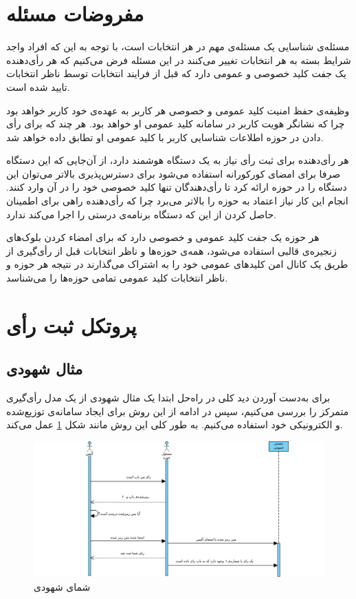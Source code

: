 \section{مفروضات مسئله}
مسئله‌ی شناسایی یک مسئله‌ی مهم در هر انتخابات است، با توجه به این که افراد واجد شرایط بسته به هر انتخابات تغییر می‌کنند در این مسئله فرض می‌کنیم که هر رأی‌دهنده یک جفت کلید خصوصی و عمومی دارد که قبل از فرایند انتخابات توسط ناظر انتخابات تایید شده است. 
\par
وظیفه‌ی حفظ امنیت کلید عمومی و خصوصی هر کاربر به عهده‌ی خود کاربر خواهد بود چرا که نشانگر هویت کاربر در سامانه‌ کلید عمومی او خواهد بود. هر چند که برای رأی دادن در حوزه اطلاعات شناسایی کاربر با کلید عمومی او تطابق داده خواهد شد.
\par
هر رأی‌دهنده برای ثبت رأی نیاز به یک دستگاه هوشمند دارد، از آن‌جایی که این دستگاه صرفا برای امضای کورکورانه استفاده می‌شود برای دسترس‌پذیری بالاتر می‌توان این دستگاه را در حوزه ارائه کرد تا رأی‌دهندگان تنها کلید خصوصی خود را در آن وارد کنند.  انجام این کار نیاز اعتماد به حوزه را بالاتر می‌برد چرا که رأی‌دهنده راهی برای اطمینان حاصل کردن از این که دستگاه برنامه‌ی درستی را اجرا می‌کند ندارد.
\par 
هر حوزه یک جفت کلید عمومی و خصوصی دارد که برای امضاء کردن بلوک‌های زنجیره‌ی قالبی استفاده می‌شود، همه‌ی حوزه‌ها و ناظر انتخابات قبل از رأی‌گیری از طریق یک کانال امن کلیدهای عمومی خود را به اشتراک می‌گذارند در نتیجه هر حوزه و ناظر انتخابات کلید عمومی تمامی حوزه‌ها را می‌شناسد.

\section{پروتکل ثبت رأی‌}
\subsection{مثال شهودی}
برای به‌دست آوردن دید کلی در راه‌حل ابتدا یک مثال شهودی از یک مدل رأی‌گیری متمرکز را بررسی می‌کنیم،‌ سپس در ادامه از این روش برای ایجاد سامانه‌ی توزیع‌شده و الکترونیکی خود استفاده می‌کنیم. به طور کلی این روش مانند شکل \ref{fig:pen} عمل می‌کند.
\begin{figure}[h!]
	\centering
	\includegraphics[width=1\linewidth]{penandpaper.png}
	\caption {شمای شهودی}
	\label{fig:pen}
\end{figure}


